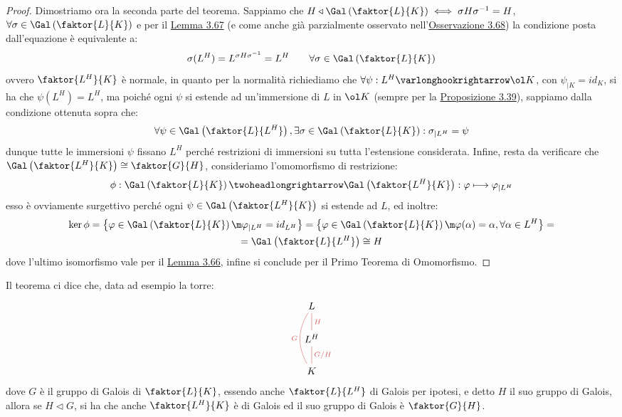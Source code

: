 \documentclass[11pt]{scrartcl}
\begin{document}
\begin{proof}
    Dimostriamo ora la seconda parte del teorema. Sappiamo che $H \triangleleft \Gal\left(\faktor{L}{K}\right) \iff \sigma H\sigma^{-1} = H$, $\forall \sigma \in \Gal\left(\faktor{L}{K}\right)$ e per il 
    \hyperref[3.67]{Lemma 3.67} (e come anche già parzialmente osservato nell'\hyperref[3.68]{Osservazione 3.68}) la condizione posta dall'equazione è equivalente a:
    \[ \sigma(L^H) = L^{\sigma H \sigma^{-1}} = L^H \qquad \forall \sigma \in \Gal\left(\faktor{L}{K}\right)
        \]
    ovvero $\faktor{L^H}{K}$ è normale, in quanto per la normalità richiediamo che $\forall \psi : L^H \varlonghookrightarrow \ol K$, con $\psi_{|K} = id_K$, si ha che $\psi(L^H) = L^H$, ma poiché ogni $\psi$ si estende ad un'immersione 
    di $L$ in $\ol K$ (sempre per la \hyperref[3.39]{Proposizione 3.39}), sappiamo dalla condizione ottenuta sopra che:
    \[ \forall \psi \in \Gal\left(\faktor{L}{L^H}\right), \exists \sigma \in \Gal\left(\faktor{L}{K}\right) : \sigma_{|L^H} = \psi
        \]
    dunque tutte le immersioni $\psi$ fissano $L^H$ perché restrizioni di immersioni su tutta l'estensione considerata.
    Infine, resta da verificare che $\Gal\left(\faktor{L^H}{K}\right) \cong \faktor{G}{H}$, consideriamo l'omomorfismo di restrizione:
    \[ \phi : \Gal\left(\faktor{L}{K}\right) \twoheadlongrightarrow \Gal\left(\faktor{L^H}{K}\right) : \varphi \longmapsto \varphi_{|L^H}
        \]
    esso è ovviamente surgettivo perché ogni $\psi \in \Gal\left(\faktor{L^H}{K}\right)$ si estende ad $L$, ed inoltre:
    \begin{multline*}
        \ker \phi = \left\{\varphi \in \Gal\left(\faktor{L}{K}\right) \m \varphi_{|L^H} = id_{L^H} \right\} = \left\{\varphi \in \Gal\left(\faktor{L}{K}\right) \m \varphi(\alpha) = \alpha, \forall \alpha \in L^H\right\} = \\ 
        = \Gal\left(\faktor{L}{L^H}\right) \cong H
    \end{multline*}
    dove l'ultimo isomorfismo vale per il \hyperref[3.66]{Lemma 3.66}, infine si conclude per il Primo Teorema di Omomorfismo.
\end{proof}

\begin{example}
    Il teorema ci dice che, data ad esempio la torre:
    \[\begin{tikzcd}
        L \\
        {L^H} \\
        K
        \arrow["G", color={rgb,255:red,214;green,92;blue,92}, bend left, no head, from=3-1, to=1-1]
        \arrow["{G/H}"', color={rgb,255:red,214;green,92;blue,92}, no head, from=3-1, to=2-1]
        \arrow["H"', color={rgb,255:red,214;green,92;blue,92}, no head, from=2-1, to=1-1]
    \end{tikzcd}\]
    dove $G$ è il gruppo di Galois di $\faktor{L}{K}$, essendo anche $\faktor{L}{L^H}$ di Galois 
    per ipotesi, e detto $H$ il suo gruppo di Galois, allora se $H \triangleleft G$,
    si ha che anche $\faktor{L^H}{K}$ è di Galois ed il suo gruppo di Galois è $\faktor{G}{H}$.
\end{example}
\end{document}
